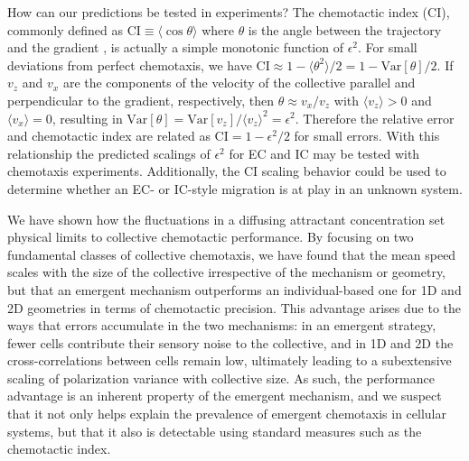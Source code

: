 How can our predictions be tested in experiments? The chemotactic index (CI), commonly defined as
$\text{CI} \equiv \langle \cos\theta \rangle$ where $\theta$ is the angle between the trajectory and the gradient \cite{van2007biased}, is actually a simple monotonic function of $\epsilon^2$. For small deviations from perfect chemotaxis, we have
$\text{CI} \approx 1 - \langle \theta^2 \rangle/2 = 1 - \text{Var}[\theta]/2$.
If $v_z$ and $v_x$ are the components of the velocity of the collective parallel and perpendicular to the gradient, respectively, then $\theta \approx v_x/v_z$ with $\langle v_z\rangle > 0$ and $\langle v_x\rangle = 0$, resulting in
$\text{Var}[\theta] = \text{Var}[v_z] / \langle v_z\rangle^2 = \epsilon^2$.
Therefore the relative error and chemotactic index are related as
$\text{CI} = 1 - \epsilon^2/2$ for small errors.
With this relationship the predicted scalings of $\epsilon^2$ for EC and IC may be tested with chemotaxis experiments. Additionally, the
CI scaling behavior could be used to determine whether an EC- or IC-style migration is at play in an unknown system.

We have shown how the fluctuations in a diffusing attractant concentration set physical limits to collective chemotactic performance. By focusing on two fundamental classes of collective chemotaxis, we have found that the mean speed scales with the size of the collective irrespective of the mechanism or geometry, but that an emergent mechanism outperforms an individual-based one for 1D and 2D geometries in terms of chemotactic precision.
This advantage arises due to the ways that errors accumulate in the two mechanisms: in an emergent strategy, fewer cells contribute their sensory noise to the collective, and in 1D and 2D the cross-correlations between cells remain low, ultimately leading to a subextensive scaling of polarization variance with collective size. As such, the performance advantage is an inherent property of the emergent mechanism, and we suspect that it not only helps explain the prevalence of emergent chemotaxis in cellular systems, but that it also is detectable using standard measures such as the chemotactic index.


